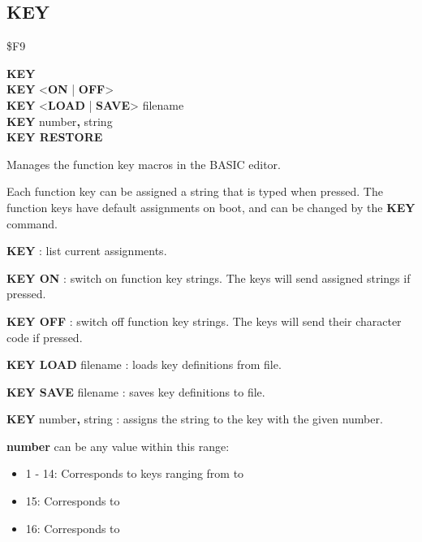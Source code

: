 
\newpage
\subsection{KEY}
\begin{description}[leftmargin=2cm,style=nextline]
\item [Token:]    \$F9

\item [Format:]   {\bf KEY} \\
                  {\bf KEY} <{\bf ON} | {\bf OFF}> \\
                  {\bf KEY} <{\bf LOAD} | {\bf SAVE}> filename \\
                  {\bf KEY} number{\bf,} string \\
                  {\bf KEY RESTORE}

\item [Usage:]    Manages the function key macros in the BASIC editor.

                  Each function key can be assigned a string that is typed when pressed. The function keys have default assignments on boot, and can be changed by the {\bf KEY} command.

                  {\bf KEY} : list current assignments.

                  {\bf KEY ON} : switch on function key strings. The keys will send assigned strings if pressed.

                  {\bf KEY OFF} : switch off function key strings. The keys will send their character code if pressed.

                  {\bf KEY LOAD} filename : loads key definitions from file.

                  {\bf KEY SAVE} filename : saves key definitions to file.

                  {\bf KEY} number{\bf ,} string : assigns the string to the key with the given number.

                  {\bf number} can be any value within this range:

                  \begin{itemize}
                     \item 1 - 14: Corresponds to keys ranging from  to 
                     \item 15: Corresponds to 
                     \item 16: Corresponds to 
                  \end{itemize}


\end{description}
